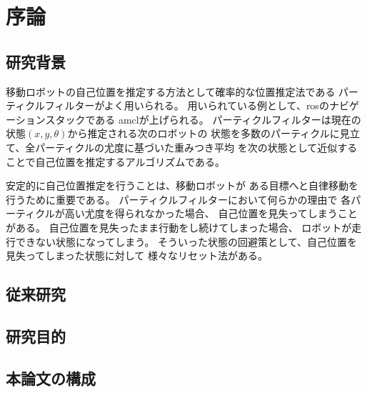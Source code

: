 \chapter{序論}
\section{研究背景}
移動ロボットの自己位置を推定する方法として確率的な位置推定法である
パーティクルフィルターがよく用いられる。
用いられている例として、rosのナビゲーションスタックである
amclが上げられる。
パーティクルフィルターは現在の状態$(x,y,\theta)$から推定される次のロボットの
状態を多数のパーティクルに見立て、全パーティクルの尤度に基づいた重みつき平均
を次の状態として近似することで自己位置を推定するアルゴリズムである。

安定的に自己位置推定を行うことは、移動ロボットが
ある目標へと自律移動を行うために重要である。
パーティクルフィルターにおいて何らかの理由で
各パーティクルが高い尤度を得られなかった場合、
自己位置を見失ってしまうことがある。
自己位置を見失ったまま行動をし続けてしまった場合、
ロボットが走行できない状態になってしまう。
そういった状態の回避策として、自己位置を見失ってしまった状態に対して
様々なリセット法がある。


\section{従来研究}


\section{研究目的}


\section{本論文の構成}







%

